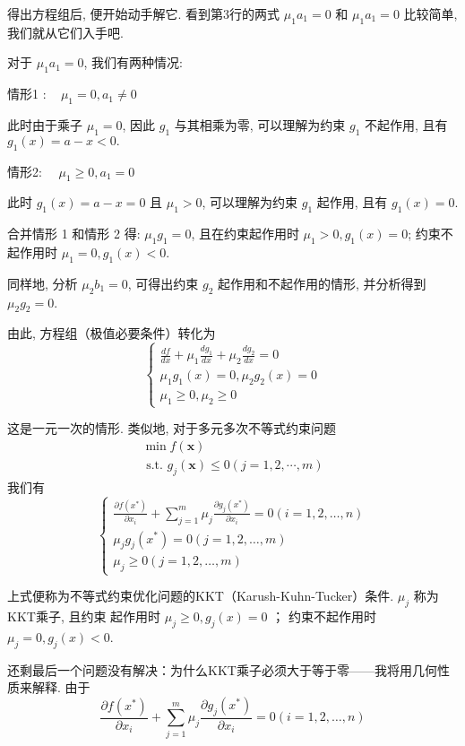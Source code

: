 得出方程组后, 便开始动手解它. 看到第3行的两式 $\mu_{1} a_{1}=0$ 和 $\mu_{1} a_{1}=0$ 比较简单, 我们就从它们入手吧.

对于 $\mu_{1} a_{1}=0$, 我们有两种情况:

情形1 $: \quad \mu_{1}=0, a_{1} \neq 0$

此时由于乘子 $\mu_{1}=0$, 因此 $g_{1}$ 与其相乘为零, 可以理解为约束 $g_{1}$ 不起作用, 且有 $g_{1}(x)=a-x<0 .$

情形2: $\quad \mu_{1} \geq 0, a_{1}=0$

此时 $g_{1}(x)=a-x=0$ 且 $\mu_{1}>0$, 可以理解为约束 $g_{1}$ 起作用, 且有 $g_{1}(x)=0$.

合并情形 1 和情形 2 得: $\mu_{1} g_{1}=0$, 且在约束起作用时 $\mu_{1}>0, g_{1}(x)=0$; 约束不起作用时 $\mu_{1}=0, g_{1}(x)<0 .$

同样地, 分析 $\mu_{2} b_{1}=0$, 可得出约束 $g_{2}$ 起作用和不起作用的情形, 并分析得到 $\mu_{2} g_{2}=0$.

由此, 方程组（极值必要条件）转化为
$$
\left\{\begin{array}{l}
\frac{d f}{d x}+\mu_{1} \frac{d g_{1}}{d x}+\mu_{2} \frac{d g_{2}}{d x}=0 \\
\mu_{1} g_{1}(x)=0, \mu_{2} g_{2}(x)=0 \\
\mu_{1} \geq 0, \mu_{2} \geq 0
\end{array}\right.
$$

这是一元一次的情形. 类似地, 对于多元多次不等式约束问题
$$
\begin{array}{l}
\min f(\mathbf{x}) \\
\text { s.t. } g_{j}(\mathbf{x}) \leq 0(j=1,2, \cdots, m)
\end{array}
$$
我们有
$$
\left\{\begin{array}{l}
\frac{\partial f\left(x^{*}\right)}{\partial x_{i}}+\sum_{j=1}^{m} \mu_{j} \frac{\partial g_{j}\left(x^{*}\right)}{\partial x_{i}}=0(i=1,2, \ldots, n) \\
\mu_{j} g_{j}\left(x^{*}\right)=0(j=1,2, \ldots, m) \\
\mu_{j} \geq 0(j=1,2, \ldots, m)
\end{array}\right.
$$

上式便称为不等式约束优化问题的KKT（Karush-Kuhn-Tucker）条件. $ \mu_{j} $ 称为KKT乘子, 且约束 起作用时 $ \mu_{j} \geq 0, g_{j}(x)=0 $ ； 约束不起作用时 $ \mu_{j}=0, g_{j}(x)<0 $.

还剩最后一个问题没有解决：为什么KKT乘子必须大于等于零——我将用几何性质来解释.
由于
$$
\frac{\partial f\left(x^{*}\right)}{\partial x_{i}}+\sum_{j=1}^{m} \mu_{j} \frac{\partial g_{j}\left(x^{*}\right)}{\partial x_{i}}=0(i=1,2, \ldots, n)
$$

